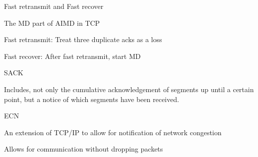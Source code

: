 \documentclass[main.tex]{subfiles}
\begin{document}
\begin{card}{Fast retransmit and Fast recover}
\item The MD part of AIMD in TCP
\item Fast retransmit: Treat three duplicate acks as a loss
\item Fast recover: After fast retransmit, start MD
\end{card}

\begin{card}{SACK}
\item Includes, not only the cumulative acknowledgement of segments up until a certain point, but a notice of which segments have been received.
\end{card}

\begin{card}{ECN}
\item An extension of TCP/IP to allow for notification of network congestion
\item Allows for communication without dropping packets
\end{card}
\end{document}

